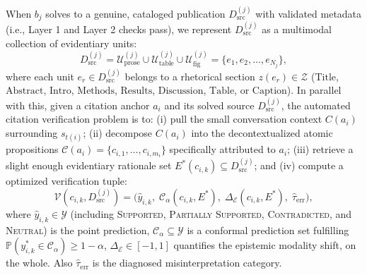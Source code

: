 \documentclass[journal]{IEEEtran}
\begin{document}
When $b_j$ solves to a genuine, cataloged publication $D_{\text{src}}^{(j)}$ with validated metadata (i.e., Layer 1 and Layer 2 checks pass), we represent $D_{\text{src}}^{(j)}$ as a multimodal collection of evidentiary units:
\begin{equation}
D_{\text{src}}^{(j)} = \mathcal{U}_{\text{prose}}^{(j)} \cup \mathcal{U}_{\text{table}}^{(j)} \cup \mathcal{U}_{\text{fig}}^{(j)} = \{e_1, e_2, \dots, e_{N_j}\},
\label{eq:source_units}
\end{equation}
where each unit $e_r \in D_{\text{src}}^{(j)}$ belongs to a rhetorical section $z(e_r) \in \mathcal{Z}$ ($\text{Title}$, $\text{Abstract}$, $\text{Intro}$, $\text{Methods}$, $\text{Results}$, $\text{Discussion}$, $\text{Table}$, or $\text{Caption}$). In parallel with this, given a citation anchor $a_i$ and its solved source $D_{\text{src}}^{(j)}$, the automated citation verification problem is to: (i) pull the small conversation context $C(a_i)$ surrounding $s_{t(i)}$; (ii) decompose $C(a_i)$ into the decontextualized atomic propositions $\mathcal{C}(a_i) = \{c_{i,1}, \dots, c_{i,m_i}\}$ specifically attributed to $a_i$; (iii) retrieve a slight enough evidentiary rationale set $E^*(c_{i,k}) \subseteq D_{\text{src}}^{(j)}$; and (iv) compute a optimized verification tuple:
\begin{equation}
\mathcal{V}(c_{i,k}, D_{\text{src}}^{(j)}) = \Big(\hat{y}_{i,k},\; \mathcal{C}_{\alpha}(c_{i,k}, E^*),\; \Delta_{\mathcal{E}}(c_{i,k}, E^*),\; \hat{\tau}_{\text{err}}\Big),
\label{eq:verification_tuple}
\end{equation}
where $\hat{y}_{i,k} \in \mathcal{Y}$ (including \textsc{Supported}, \textsc{Partially Supported}, \textsc{Contradicted}, and \textsc{Neutral}) is the point prediction, $\mathcal{C}_{\alpha} \subseteq \mathcal{Y}$ is a conformal prediction set fulfilling $\mathbb{P}(y^*_{i,k} \in \mathcal{C}_{\alpha}) \geq 1-\alpha$, $\Delta_{\mathcal{E}} \in [-1, 1]$ quantifies the epistemic modality shift, on the whole. Also $\hat{\tau}_{\text{err}}$ is the diagnosed misinterpretation category.
\end{document}

